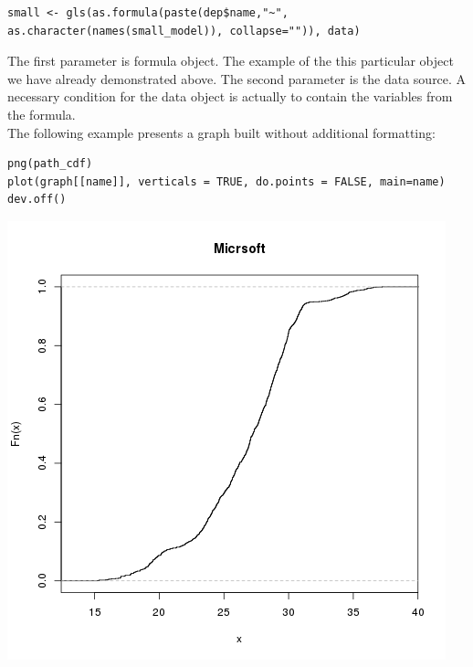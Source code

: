 \documentclass[
  twoside,
  12pt, a4paper,
  footinclude=true,
  headinclude=true,
  cleardoublepage=empty
]{article}
\begin{document}
\begin{verbatim}
small <- gls(as.formula(paste(dep$name,"~", as.character(names(small_model)), collapse="")), data)
\end{verbatim} 
The first parameter is formula object. The example of the this particular object we have already demonstrated above. The second parameter is the data source. A necessary condition for the data object is actually to contain the variables from the formula.\\
The following example presents a graph built without additional formatting:
\begin{verbatim}
png(path_cdf)
plot(graph[[name]], verticals = TRUE, do.points = FALSE, main=name)
dev.off()
\end{verbatim}
\includegraphics[scale=0.75]{RPlotExample.png}
 
\end{document}

